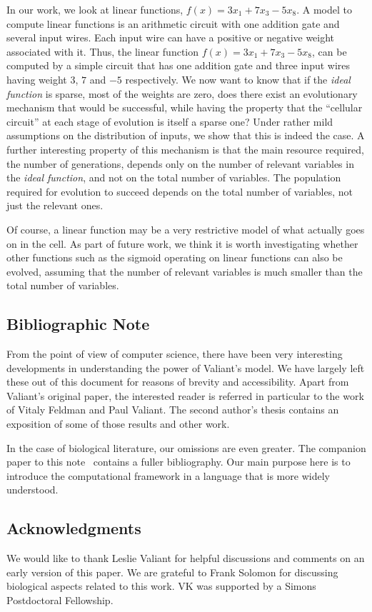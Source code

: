 \documentclass{acmtr2e}
\begin{document}
In our work, we look at linear functions, \eg $f(x) = 3x_1 + 7 x_3 - 5 x_8$.  A
model to compute linear functions is an arithmetic circuit with one addition
gate and several input wires. Each input wire can have a positive or negative
weight associated with it.  Thus, the linear function $f(x) = 3x_1 + 7 x_3
-5x_8$, can be computed by a simple circuit that has one addition gate and three
input wires having weight $3$, $7$ and $-5$ respectively. We now want to know
that if the \emph{ideal function} is sparse, \ie most of the weights are zero,
does there exist an evolutionary mechanism that would be successful, while
having the property that the ``cellular circuit'' at each stage of evolution is
itself a sparse one? Under rather mild assumptions on the distribution of
inputs, we show that this is indeed the case. A further interesting property of
this mechanism is that the main resource required, the number of generations,
depends only on the number of relevant variables in the \emph{ideal function},
and not on the total number of variables. The population required for evolution
to succeed depends on the total number of variables, not just the relevant ones.

Of course, a linear function may be a very restrictive model of what actually
goes on in the cell. As part of future work, we think it is worth investigating
whether other functions such as the sigmoid operating on linear functions can also
be evolved, assuming that the number of relevant variables is much smaller than
the total number of variables.

\subsection*{Bibliographic Note}

From the point of view of computer science, there have been very interesting
developments in understanding the power of Valiant's model. We have largely left
these out of this document for reasons of brevity and accessibility. Apart from
Valiant's original paper, the interested reader is referred in particular to the
work of Vitaly Feldman and Paul Valiant. The second author's thesis contains an
exposition of some of those results and other work.

In the case of biological literature, our omissions are even greater. The
companion paper to this note~\cite{AK:2013} contains a fuller bibliography. Our
main purpose here is to introduce the computational framework in a language that
is more widely understood.

\subsection*{Acknowledgments} 
We would like to thank Leslie Valiant for helpful discussions and comments on an
early version of this paper. We are grateful to Frank Solomon for discussing
biological aspects related to this work. VK was supported by a Simons
Postdoctoral Fellowship.



\end{document}
